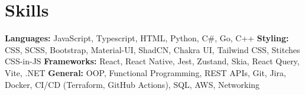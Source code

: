 \vspace{5 pt - 0.5 cm}
\section{Skills}
\begin{onecolentry}
    \textbf{Languages:} JavaScript, Typescript, HTML, Python, C\#, Go, C++ \newline
    \textbf{Styling:} CSS, SCSS, Bootstrap, Material-UI, ShadCN, Chakra UI, Tailwind CSS, Stitches CSS-in-JS\newline
    \textbf{Frameworks:} React, React Native, Jest, Zustand, Skia, React Query, Vite, .NET  \newline
    \textbf{General:} OOP, Functional Programming, REST APIs, Git, Jira, Docker, CI/CD (Terraform, GitHub Actions), SQL, AWS, Networking \newline
\end{onecolentry}